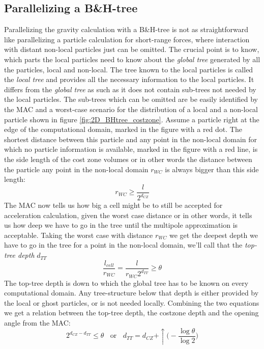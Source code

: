 \subsection{Parallelizing a B\&H-tree}
Parallelizing the gravity calculation with a  B\&H-tree is not as straightforward like parallelizing a particle calculation for short-range forces, where interaction with distant non-local particles just can be omitted. The crucial point is to know, which parts the local particles need to know about the \emph{global tree} generated by all the particles, local and non-local. The tree known to the local particles is called the \emph{local tree} and provides all the necessary information to the local particles. It differs from the \emph{global tree} as such as it does not contain sub-trees not needed by the local particles. The sub-trees which can be omitted are be easily identified by the MAC and a worst-case scenario for the distribution of a local and a non-local particle shown in figure \ref{fig:2D_BHtree_costzone}. Assume a particle right at the edge of the computational domain, marked in the figure with a red dot. The shortest distance between this particle and any point in the non-local domain for which no particle information is available, marked in the figure with a red line, is the side length of the cost zone volumes or in other words the distance between the particle any point in the non-local domain $r_{WC}$ is always bigger than this side length:
\begin{equation}
r_{WC} \ge \frac{l}{2^{d_{CZ}} } 
\end{equation}
The MAC now tells us how big a cell might be to still be accepted for acceleration calculation, given the worst case distance or in other words, it tells us how deep we have to go in the tree until the multipole approximation is acceptable. Taking the worst case with distance $r_{WC}$ we get the deepest depth we have to go in the tree for a point in the non-local domain, we'll call that the \emph{top-tree depth} $d_{TT}$
\begin{equation}
\frac{l_{cell}}{r_{WC}} = \frac{l}{r_{WC} 2^{d_{TT}}} \ge \theta
\end{equation}
The top-tree depth is down to which the global tree has to be known on every computational domain. Any tree-structure below that depth is either provided by the local or ghost particles, or is not needed locally. Combining the two equations we get a relation between the top-tree depth, the costzone depth and the opening angle from the MAC:
\begin{equation}
2^{d_{CZ} - d_{TT}} \le \theta ~~~~\text{or}~~~~ d_{TT} = d_{CZ} + \uparrow \Big( - \frac{ \log{\theta} }{\log{2} } \Big)
\end{equation}
